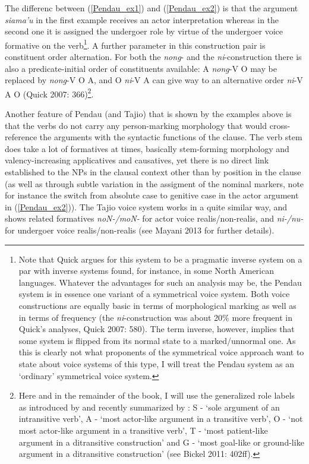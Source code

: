 The differenc between (\ref{Pendau_ex1}) and (\ref{Pendau_ex2}) is that the argument \textit{siama'u} in the first example receives an actor interpretation whereas in the second one it is assigned the undergoer role by virtue of the undergoer voice formative on the verb\footnote{Note that Quick argues for this system to be a pragmatic inverse system on a par with inverse systems found, for instance, in some North American languages. Whatever the advantages for such an analysis may be, the Pendau system is in essence one variant of a symmetrical voice system. Both voice constructions are equally basic in terms of morphological marking as well as in terms of frequency (the \textit{ni}-construction was about 20\% more frequent in Quick's analyses, Quick 2007: 580). The term inverse, however, implies that some system is flipped from its normal state to a marked/unnormal one. As this is clearly not what proponents of the symmetrical voice approach want to state about voice systems of this type, I will treat the Pendau system as an `ordinary' symmetrical voice system.}. A further parameter in this construction pair is constituent order alternation. For both the \textit{nong}- and the \textit{ni}-construction there is also a predicate-initial order of constituents available: A \textit{nong}-V O may be replaced by \textit{nong}-V O A, and O \textit{ni}-V A can give way to an alternative order \textit{ni}-V A O (Quick 2007: 366)\footnote{Here and in the remainder of the book, I will use the generalized role labels as introduced by \textcite{Dixon1979} and recently summarized by \textcite{Bickel2011}: S - `sole argument of an intransitive verb', A - `most actor-like argument in a transitive verb', O - `not most actor-like argument in a transitive verb', T - `most patient-like argument in a ditransitive construction' and G - `most goal-like or ground-like argument in a ditransitive construction' (see Bickel 2011: 402ff).}.

Another feature of Pendau (and Tajio) that is shown by the examples above is that the verbs do not carry any person-marking morphology that would cross-reference the arguments with the syntactic functions of the clause. The verb stem does take a lot of formatives at times, basically stem-forming morphology and valency-increasing applicatives and causatives, yet there is no direct link established to the NPs in the clausal context other than by position in the clause (as well as through subtle variation in the assigment of the nominal markers, note for instance the switch from absolute case to genitive case in the actor argument in (\ref{Pendau_ex2})). The Tajio voice system works in a quite similar way, and shows related formatives \textit{noN-/moN-} for actor voice realis/non-realis, and \textit{ni-/nu-} for undergoer voice realis/non-realis (see Mayani 2013 for further details). 

